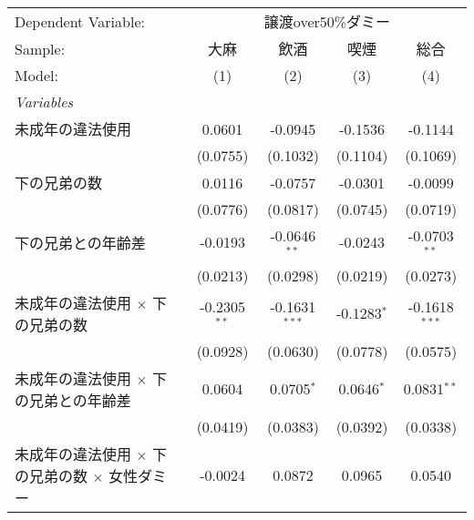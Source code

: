 \documentclass{article}
\begin{document}
\begin{landscape}


\begingroup
\centering
\begin{threeparttable}[b]
   \begin{tabular}{lcccc}
      \tabularnewline \midrule \midrule
      Dependent Variable: & \multicolumn{4}{c}{譲渡over50\%ダミー}\\
      Sample:                                                      & 大麻           & 飲酒            & 喫煙          & 総合 \\   
      Model:                                                       & (1)            & (2)             & (3)           & (4)\\  
      \midrule
      \emph{Variables}\\
      未成年の違法使用                                             & 0.0601         & -0.0945         & -0.1536       & -0.1144\\   
                                                                   & (0.0755)       & (0.1032)        & (0.1104)      & (0.1069)\\   
      下の兄弟の数                                                 & 0.0116         & -0.0757         & -0.0301       & -0.0099\\   
                                                                   & (0.0776)       & (0.0817)        & (0.0745)      & (0.0719)\\   
      下の兄弟との年齢差                                           & -0.0193        & -0.0646$^{**}$  & -0.0243       & -0.0703$^{**}$\\   
                                                                   & (0.0213)       & (0.0298)        & (0.0219)      & (0.0273)\\   
      未成年の違法使用 $\times$ 下の兄弟の数                       & -0.2305$^{**}$ & -0.1631$^{***}$ & -0.1283$^{*}$ & -0.1618$^{***}$\\   
                                                                   & (0.0928)       & (0.0630)        & (0.0778)      & (0.0575)\\   
      未成年の違法使用 $\times$ 下の兄弟との年齢差                 & 0.0604         & 0.0705$^{*}$    & 0.0646$^{*}$  & 0.0831$^{**}$\\   
                                                                   & (0.0419)       & (0.0383)        & (0.0392)      & (0.0338)\\   
      未成年の違法使用 $\times$ 下の兄弟の数 $\times$ 女性ダミー   & -0.0024        & 0.0872          & 0.0965        & 0.0540\\   

\end{tabular}
\end{threeparttable}
\end{landscape}
\end{document}
